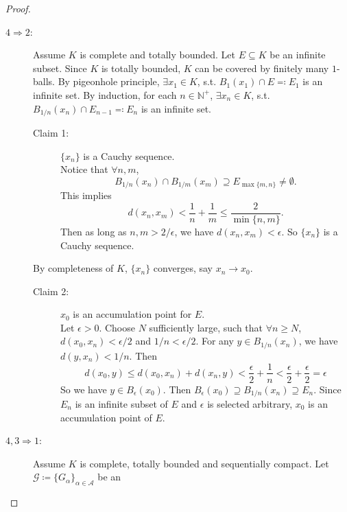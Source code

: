 \documentclass[12pt]{article}
\theoremstyle{plain}
\theoremstyle{definition}
\begin{document}
\begin{proof}
\begin{description}
        \item[$4\Rightarrow 2$:]
            Assume $K$ is complete and totally bounded.
            Let $E\subseteq K$ be an infinite subset.
            Since $K$ is totally bounded, $K$ can be covered by finitely many
            $1$-balls.
            By pigeonhole principle, $\exists x_1\in K$, s.t.
            $B_1(x_1)\cap E\eqqcolon E_1$ is an infinite set.
            By induction, for each $n\in\mathbb{N}^+$, $\exists x_n\in K$, s.t.
            $B_{1/n}(x_n)\cap E_{n-1}\eqqcolon E_n$ is an infinite set.
            \begin{description}
                \item[Claim 1: ]$\{x_n\}$ is a Cauchy sequence.\\
                    Notice that $\forall n,m$,
                    $$B_{1/n}(x_n)\cap B_{1/m}(x_m)\supseteq
                    E_{\max\{m,n\}}\neq\emptyset.$$
                    This implies
                    $$d(x_n,x_m)<\frac{1}{n}+\frac{1}{m}\leq\frac{2}{\min\{n,m\}}.$$
                    Then as long as $n,m>2/\epsilon$, we have
                    $d(x_n,x_m)<\epsilon$.
                    So $\{x_n\}$ is a Cauchy sequence.
            \end{description}
            By completeness of $K$, $\{x_n\}$ converges, say $x_n\rightarrow
            x_0$.
            \begin{description}
                \item[Claim 2: ]$x_0$ is an accumulation point for $E$.\\
                    Let $\epsilon>0$. Choose $N$ sufficiently large, such
                    that $\forall n\geq N$, $d(x_0,x_n)<\epsilon/2$ and
                    $1/n<\epsilon/2$.
                    For any $y\in B_{1/n}(x_n)$, we have $d(y,x_n)<1/n$.
                    Then
                    $$d(x_0,y)\leq d(x_0,x_n)+d(x_n,y)
                    <\frac{\epsilon}{2}+\frac{1}{n}
                    <\frac{\epsilon}{2}+\frac{\epsilon}{2}=\epsilon$$
                    So we have $y\in B_{\epsilon}(x_0)$.
                    Then $B_{\epsilon}(x_0)\supseteq B_{1/n}(x_n)\supseteq E_n$.
                    Since $E_n$ is an infinite subset of $E$ and $\epsilon$ is
                    selected arbitrary, $x_0$ is an accumulation point of $E$.
            \end{description}
        \item[$4, 3\Rightarrow 1$:]
            Assume $K$ is complete, totally bounded and sequentially compact.
            Let $\mathcal{G}\coloneqq\{G_\alpha\}_{\alpha\in\mathcal{A}}$ be an

\end{description}
\end{proof}
\end{document}
